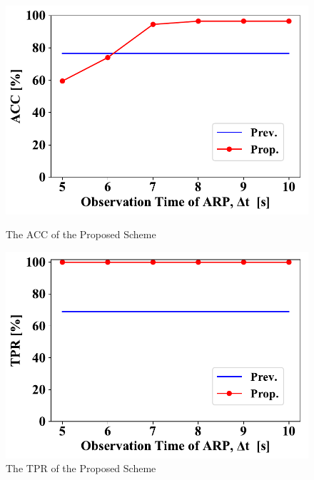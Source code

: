\documentclass[conference]{IEEEtran}
\begin{document}
\begin{figure}[ht]
    \begin{minipage}{0.33\hsize}
        \begin{center}
            \includegraphics[scale=0.4]{image/ACC.pdf}
        \end{center}
        \caption{The ACC of the Proposed Scheme}
        \label{fig:acc}
    \end{minipage}
    \begin{minipage}{0.33\hsize}
        \begin{center}
            \includegraphics[scale=0.4]{image/TPR.pdf}
        \end{center}
        \caption{The TPR of the Proposed Scheme}
        \label{fig:tpr}
    \end{minipage}
    \begin{minipage}{0.33\hsize}

\end{minipage}
\end{figure}
\end{document}
